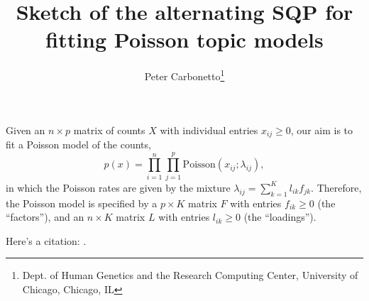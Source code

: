\documentclass[final]{siamart171218}
\title{Sketch of the alternating SQP for fitting Poisson topic models}
\author{Peter Carbonetto\thanks{Dept. of Human Genetics and the Research Computing Center, University of Chicago, Chicago, IL}}
\begin{document}
\maketitle

\noindent Given an $n \times p$ matrix of counts $X$ with individual
entries $x_{ij} \geq 0$, our aim is to fit a Poisson model of the
counts,
\begin{equation}
p(x) = \prod_{i=1}^n \prod_{j=1}^p \mathrm{Poisson}(x_{ij}; \lambda_{ij}),
\end{equation}
in which the Poisson rates are given by the mixture $\lambda_{ij} =
\sum_{k=1}^K l_{ik} f_{jk}$. Therefore, the Poisson model is specified
by a $p \times K$ matrix $F$ with entries $f_{ik} \geq 0$ (the
``factors''), and an $n \times K$ matrix $L$ with entries $l_{ik} \geq
0$ (the ``loadings'').

Here's a citation: \cite{blei-2003}.



\end{document}
